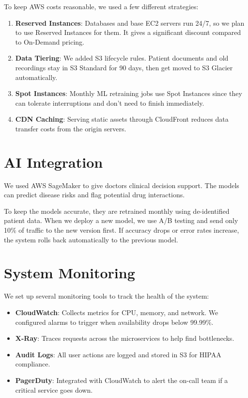 \documentclass{article}
\begin{document}
To keep AWS costs reasonable, we used a few different strategies:

\begin{enumerate}
    \item \textbf{Reserved Instances}: Databases and base EC2 servers run 24/7, so we plan to use Reserved Instances for them. It gives a significant discount compared to On-Demand pricing.
    \item \textbf{Data Tiering}: We added S3 lifecycle rules. Patient documents and old recordings stay in S3 Standard for 90 days, then get moved to S3 Glacier automatically.
    \item \textbf{Spot Instances}: Monthly ML retraining jobs use Spot Instances since they can tolerate interruptions and don't need to finish immediately.
    \item \textbf{CDN Caching}: Serving static assets through CloudFront reduces data transfer costs from the origin servers.
\end{enumerate}

\vspace{4cm}
\section{AI Integration}

We used AWS SageMaker to give doctors clinical decision support. The models can predict disease risks and flag potential drug interactions.

To keep the models accurate, they are retrained monthly using de-identified patient data. When we deploy a new model, we use A/B testing and send only 10\% of traffic to the new version first. If accuracy drops or error rates increase, the system rolls back automatically to the previous model.

\vspace{4cm}
\section{System Monitoring}

We set up several monitoring tools to track the health of the system:

\begin{itemize}
    \item \textbf{CloudWatch}: Collects metrics for CPU, memory, and network. We configured alarms to trigger when availability drops below 99.99\%.
    \item \textbf{X-Ray}: Traces requests across the microservices to help find bottlenecks.
    \item \textbf{Audit Logs}: All user actions are logged and stored in S3 for HIPAA compliance.
    \item \textbf{PagerDuty}: Integrated with CloudWatch to alert the on-call team if a critical service goes down.
\end{itemize}
\end{document}
